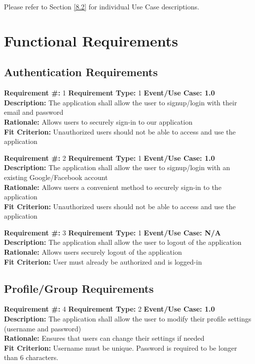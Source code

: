 \documentclass[12pt]{article}
\begin{document}
Please refer to Section \ref{8.2} for individual Use Case descriptions.

\section{Functional Requirements}
\noindent

\subsection{Authentication Requirements} 
\noindent

\textbf{Requirement \#:} 1 \quad \textbf{Requirement Type:} 1 \quad \textbf{Event/Use Case: 1.0}
\medskip
\\\textbf{Description:} The application shall allow the user to signup/login with their email and password
\\\textbf{Rationale:} Allows users to securely sign-in to our application
\\\textbf{Fit Criterion:} Unauthorized users should not be able to access and use the application

\bigskip
\textbf{Requirement \#:} 2 \quad \textbf{Requirement Type:} 1 \quad \textbf{Event/Use Case: 1.0}
\medskip
\\\textbf{Description:} The application shall allow the user to signup/login with an existing Google/Facebook account
\\\textbf{Rationale:} Allows users a convenient method to securely sign-in to the application 
\\\textbf{Fit Criterion:} Unauthorized users should not be able to access and use the application

\bigskip
\textbf{Requirement \#:} 3 \quad \textbf{Requirement Type:} 1 \quad \textbf{Event/Use Case: N/A}
\medskip
\\\textbf{Description:} The application shall allow the user to logout of the application 
\\\textbf{Rationale:} Allows users securely logout of the application 
\\\textbf{Fit Criterion:} User must already be authorized and is logged-in

\subsection{Profile/Group Requirements} 
\noindent

\textbf{Requirement \#:} 4 \quad \textbf{Requirement Type:} 2 \quad \textbf{Event/Use Case: 1.0}
\medskip
\\\textbf{Description:} The application shall allow the user to modify their profile settings (username and password)
\\\textbf{Rationale:} Ensures that users can change their settings if needed
\\\textbf{Fit Criterion:} Username must be unique. Password is required to be longer than 6 characters.
\end{document}
